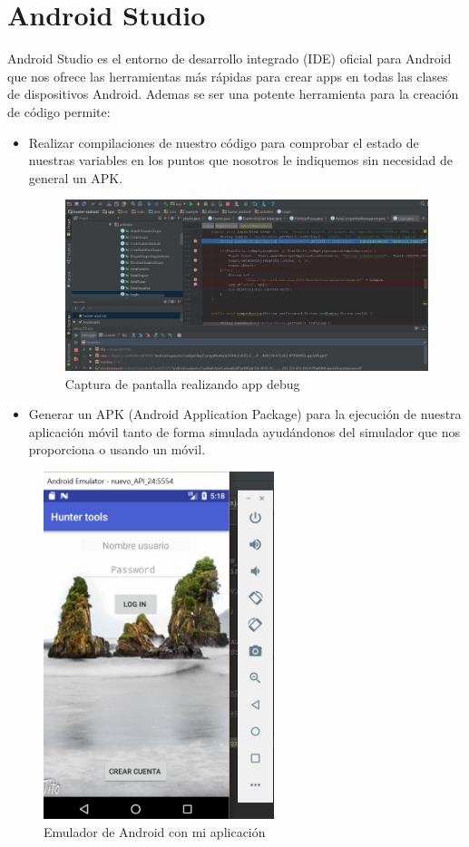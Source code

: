 \section{Android Studio}
Android Studio es el entorno de desarrollo integrado (IDE)  oficial para Android que nos ofrece las herramientas más rápidas para crear apps en todas las clases de dispositivos Android.
Ademas se ser una potente herramienta para la creación de código permite:

\begin{itemize}
\item Realizar compilaciones  de nuestro código para comprobar el estado de nuestras variables en los puntos que nosotros le indiquemos sin necesidad de general un APK.
\begin{figure}
		\centering
		\includegraphics[width=\textwidth] {debug.png}
		\caption{Captura de pantalla realizando app debug }\label{fig:debug}
	\end{figure}

\item Generar un APK (Android Application Package) para la ejecución de nuestra aplicación móvil tanto de forma simulada ayudándonos del simulador que nos proporciona o usando un móvil.
\end{itemize}
\begin{figure}
		\centering
		\includegraphics[width=0.6\textwidth] {emulador.png}
		\caption{Emulador de Android con mi aplicación}
		\label{fig:emulador}
	\end{figure}
 



